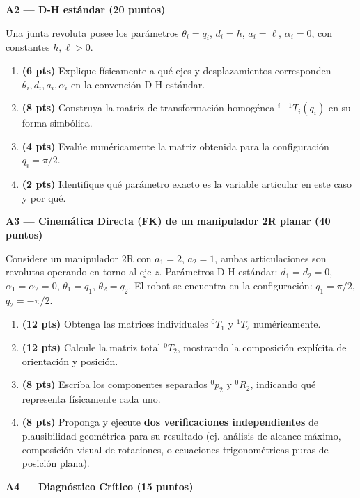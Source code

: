 \documentclass[11pt, a4paper]{article}
\begin{document}
\vspace{0.4cm}
\noindent\textbf{\large A2 — D-H estándar (20 puntos)}

Una junta revoluta posee los parámetros $\theta_i=q_i$, $d_i=h$, $a_i=\ell$, $\alpha_i=0$, con constantes $h, \ell > 0$.

\begin{enumerate}
    \item \textbf{(6 pts)} Explique físicamente a qué ejes y desplazamientos corresponden $\theta_i, d_i, a_i, \alpha_i$ en la convención D-H estándar.
    \item \textbf{(8 pts)} Construya la matriz de transformación homogénea ${}^{i-1}T_i(q_i)$ en su forma simbólica.
    \item \textbf{(4 pts)} Evalúe numéricamente la matriz obtenida para la configuración $q_i = \pi/2$.
    \item \textbf{(2 pts)} Identifique qué parámetro exacto es la variable articular en este caso y por qué.
\end{enumerate}

\vspace{0.4cm}
\noindent\textbf{\large A3 — Cinemática Directa (FK) de un manipulador 2R planar (40 puntos)}

Considere un manipulador 2R con $a_1=2$, $a_2=1$, ambas articulaciones son revolutas operando en torno al eje $z$. Parámetros D-H estándar: $d_1=d_2=0$, $\alpha_1=\alpha_2=0$, $\theta_1=q_1$, $\theta_2=q_2$. El robot se encuentra en la configuración: $q_1=\pi/2$, $q_2=-\pi/2$.

\begin{enumerate}
    \item \textbf{(12 pts)} Obtenga las matrices individuales ${}^0T_1$ y ${}^1T_2$ numéricamente.
    \item \textbf{(12 pts)} Calcule la matriz total ${}^0T_2$, mostrando la composición explícita de orientación y posición.
    \item \textbf{(8 pts)} Escriba los componentes separados ${}^0p_2$ y ${}^0R_2$, indicando qué representa físicamente cada uno.
    \item \textbf{(8 pts)} Proponga y ejecute \textbf{dos verificaciones independientes} de plausibilidad geométrica para su resultado (ej. análisis de alcance máximo, composición visual de rotaciones, o ecuaciones trigonométricas puras de posición plana).
\end{enumerate}

\vspace{0.4cm}
\noindent\textbf{\large A4 — Diagnóstico Crítico (15 puntos)}
\end{document}
